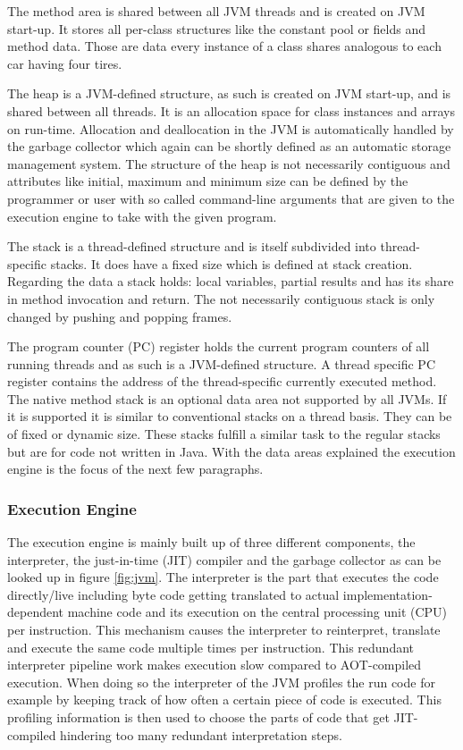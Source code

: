 The method area is shared between all JVM threads and is created on JVM start-up. It stores all per-class structures like the constant pool or fields and method data. Those are data every instance of a class shares analogous to each car having four tires.

The heap is a JVM-defined structure, as such is created on JVM start-up, and is shared between all threads. It is an allocation space for class instances and arrays on run-time. Allocation and deallocation in the JVM is automatically handled by the garbage collector which again can be shortly defined as an automatic storage management system. The structure of the heap is not necessarily contiguous and attributes like initial, maximum and minimum size can be defined by the programmer or user with so called command-line arguments that are given to the execution engine to take with the given program.

The stack is a thread-defined structure and is itself subdivided into thread-specific stacks. It does have a fixed size which is defined at stack creation. Regarding the data a stack holds: local variables, partial results and has its share in method invocation and return. The not necessarily contiguous stack is only changed by pushing and popping frames.

The program counter (PC) register holds the current program counters of all running threads and as such is a JVM-defined structure. A thread specific PC register contains the address of the thread-specific currently executed method.
The native method stack is an optional data area not supported by all JVMs. If it is supported it is similar to conventional stacks on a thread basis. They can be of fixed or dynamic size. These stacks fulfill a similar task to the regular stacks but are for code not written in Java. With the data areas explained the execution engine is the focus of the next few paragraphs.

\subsubsection{Execution Engine}

The execution engine is mainly built up of three different components, the interpreter, the just-in-time (JIT) compiler and the garbage collector as can be looked up in figure \ref{fig:jvm}. The interpreter is the part that executes the code directly/live including byte code getting translated to actual implementation-dependent machine code and its execution on the central processing unit (CPU) per instruction. This mechanism causes the interpreter to reinterpret, translate and execute the same code multiple times per instruction. This redundant interpreter pipeline work makes execution slow compared to AOT-compiled execution. When doing so the interpreter of the JVM profiles the run code for example by keeping track of how often a certain piece of code is executed. This profiling information is then used to choose the parts of code that get JIT-compiled hindering too many redundant interpretation steps.

